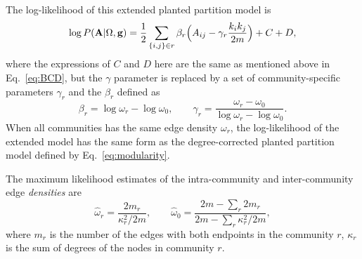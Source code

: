 The log-likelihood of this extended planted partition model is 
\begin{equation} \label{eq:ll_new}
    \log P({\bf A}|\Omega, {\bf g}) =  \frac{1}{2} \sum_{\{i,j\} \in r} \beta_r \Big(A_{ij} - \gamma_r \frac{k_i k_j}{2m} \Big) + C + D,
\end{equation}
where the expressions of $C$ and $D$ here are the same as mentioned above in Eq.~\ref{eq:BCD}, but the $\gamma$ parameter is replaced by a set of community-specific parameters $\gamma_r$ and the $\beta_r$ defined as
\begin{equation} \label{eq:para}
   \beta_r = \log \omega_r - \log \omega_0, \quad \quad \gamma_r = \frac{\omega_r-\omega_0}{\log \omega_r- \log \omega_0}.
\end{equation}
When all communities has the same edge density $\omega_r$, the log-likelihood of the extended model has the same form as the degree-corrected planted partition model defined by Eq.~\ref{eq:modularity}.

The maximum likelihood estimates of the intra-community and inter-community edge {\it densities} are 
\begin{equation}
    \hat{\omega}_r = \frac{2m_r}{\kappa_r^2 / 2m}, \quad \quad \hat{\omega}_0 = \frac{2m - \sum_r 2m_r}{2m - \sum_r \kappa_r^2 / 2m},
\end{equation}
where $m_r$ is the number of the edges with both endpoints in the community $r$, $\kappa_r$ is the sum of degrees of the nodes in community $r$.

